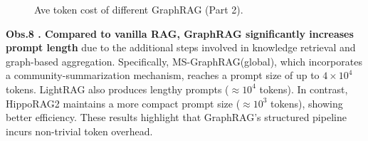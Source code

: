 \documentclass{article} %
\begin{document}
\begin{figure}
\vspace{-1ex}
\centering

\begin{minipage}{0.57\textwidth}
\centering
\captionsetup{type=table}
\caption{Ave token cost of different GraphRAG (Part 1).}
\vspace{-1mm}

\end{minipage}

\vspace{1ex}

\begin{minipage}{0.57\textwidth}
\centering
\captionsetup{type=table}
\caption{Ave token cost of different GraphRAG (Part 2).}
\vspace{-1mm}

\end{minipage}
\vspace{-2ex}
\end{figure}


\textbf{Obs.8 . Compared to vanilla RAG, GraphRAG significantly increases prompt length} due to the additional steps involved in knowledge retrieval and graph-based aggregation. Specifically, MS-GraphRAG(global), which incorporates a community-summarization mechanism, reaches a prompt size of up to $4\times10^4$ tokens. LightRAG also produces lengthy prompts ($\approx 10^4$ tokens). In contrast, HippoRAG2 maintains a more compact prompt size ($\approx 10^3$ tokens), showing better efficiency. These results highlight that GraphRAG’s structured pipeline incurs non-trivial token overhead.
\end{document}
